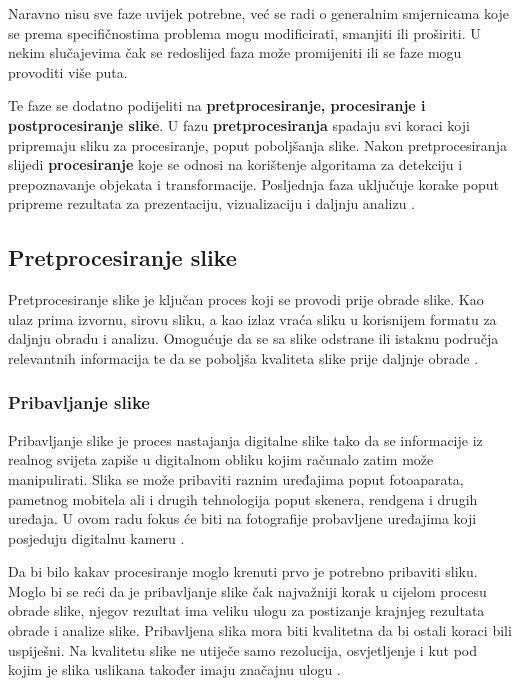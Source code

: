 \documentclass{foi}
\begin{document}
Naravno nisu sve faze uvijek potrebne, već se radi o generalnim smjernicama koje se prema specifičnostima problema mogu modificirati, smanjiti ili proširiti. U nekim slučajevima čak se redoslijed faza može promijeniti ili se faze mogu provoditi više puta.    

Te faze se dodatno podijeliti na \textbf{pretprocesiranje, procesiranje i postprocesiranje slike}. U fazu \textbf{pretprocesiranja} spadaju svi koraci koji pripremaju sliku za procesiranje, poput poboljšanja slike. Nakon pretprocesiranja slijedi \textbf{procesiranje} koje se odnosi na korištenje algoritama za detekciju i prepoznavanje objekata i transformacije. Posljednja faza uključuje korake poput pripreme rezultata za prezentaciju, vizualizaciju i daljnju analizu \cite{IamgeProcesingPhases}.

\pagebreak
\subsection{Pretprocesiranje slike}

Pretprocesiranje slike je ključan proces koji se provodi prije obrade slike. Kao ulaz prima izvornu, sirovu sliku, a kao izlaz vraća sliku u korisnijem formatu za daljnju obradu i analizu. Omogućuje da se sa slike odstrane ili istaknu područja relevantnih informacija te da se poboljša kvaliteta slike prije daljnje obrade \cite{Patel2023Oct}.


\subsubsection{Pribavljanje slike}

Pribavljanje slike je proces nastajanja digitalne slike tako da se informacije iz realnog svijeta zapiše u digitalnom obliku kojim računalo zatim može manipulirati. Slika se može pribaviti raznim uređajima poput fotoaparata, pametnog mobitela ali i drugih tehnologija poput skenera, rendgena i drugih uređaja. U ovom radu fokus će biti na fotografije probavljene uređajima koji posjeduju digitalnu kameru \cite{BibEntry2025Apr}.


Da bi bilo kakav procesiranje moglo krenuti prvo je potrebno pribaviti sliku. Moglo bi se reći da je pribavljanje slike čak najvažniji korak u cijelom procesu obrade slike, njegov rezultat ima veliku ulogu za postizanje krajnjeg rezultata obrade i analize slike. Pribavljena slika mora biti kvalitetna da bi ostali koraci bili uspiješni. Na kvalitetu slike ne utiječe samo rezolucija, osvjetljenje i kut pod kojim je slika uslikana također imaju značajnu ulogu \cite{BibEntry2025Apr}.
\end{document}
